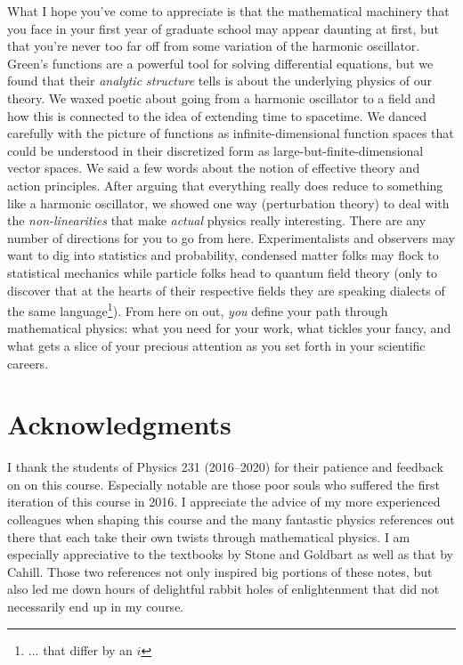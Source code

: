 \documentclass[12pt]{article}
\begin{document}
What I hope you've come to appreciate is that the mathematical machinery that you face in your first year of graduate school may appear daunting at first, but that you're never too far off from some variation of the harmonic oscillator. Green's functions are a powerful tool for solving differential equations, but we found that their \emph{analytic structure} tells is about the underlying physics of our theory. We waxed poetic about going from a harmonic oscillator to a field and how this is connected to the idea of extending time to spacetime. We danced carefully with the picture of functions as infinite-dimensional function spaces that could be understood in their discretized form as large-but-finite-dimensional vector spaces. We said a few words about the notion of effective theory and action principles. After arguing that everything really does reduce to something like a harmonic oscillator, we showed one way (perturbation theory) to deal with the \emph{non-linearities} that make \emph{actual} physics really interesting. There are any number of directions for you to go from here. Experimentalists and observers may want to dig into statistics and probability, condensed matter folks may flock to statistical mechanics while particle folks head to quantum field theory (only to discover that at the hearts of their respective fields they are speaking dialects of the same language\footnote{... that differ by an $i$}). From here on out, \emph{you} define your path through mathematical physics: what you need for your work, what tickles your fancy, and what gets a slice of your precious attention as you set forth in your scientific careers.



\section*{Acknowledgments}
%
I thank the students of Physics 231 (2016--2020) for their patience and feedback on on this course. Especially notable are those poor souls who suffered the first iteration of this course in 2016. I appreciate the advice of my more experienced colleagues when shaping this course and the many fantastic physics references out there that each take their own twists through mathematical physics. I am especially appreciative to the textbooks by Stone and Goldbart as well as that by Cahill. Those two references not only inspired big portions of these notes, but also led me down hours of delightful rabbit holes of enlightenment that did not necessarily end up in my course.

\appendix




%



% 
\end{document}
